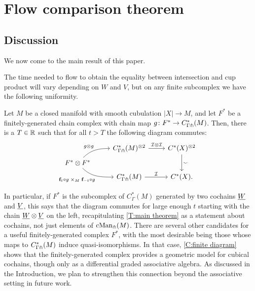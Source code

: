 
\section{Flow comparison theorem}\label{S:flow comparison theorem}

\subsection{Discussion}

We now come to the main result of this paper.

\maintheorem*

The time needed to flow to obtain the equality between intersection and cup product will vary depending on $W$ and $V$, but on any finite subcomplex we have the following uniformity.

\begin{corollary}\label{C:finite diagram}
	Let $M$ be a closed manifold with smooth cubulation $|X| \to M$, and let $F^*$ be a finitely-generated chain complex with chain map $g \colon F^*\to C^*_{\Gamma \pitchfork}(M)$.
	Then, there is a $T \in \mathbb{R}$ such that for all $t > T$ the following diagram commutes:
	\begin{equation*}
		\begin{tikzcd} [row sep=tiny]
			& C^*_{\Gamma \pf}(M)^{\otimes 2} \arrow[r, "\cI \otimes \cI"] & \cochains(X)^{\otimes 2} \arrow[dd, "\sms"] \\
			F^*\otimes F^* \arrow[ur, in=180, out=45,"g\otimes g"] \arrow[dr, in=180, out=-45, "\f_t \circ g \; \times_M \; \f_{-t} \circ g"']& & \\
			& C^*_{\Gamma \pf}(M) \arrow[r, "\cI"] & \cochains(X).
		\end{tikzcd}
	\end{equation*}
\end{corollary}

In particular, if $F^*$ is the subcomplex of $C^*_\Gamma(M)$ generated by two cochains $\underline{W}$ and $\underline{V}$, this says that the diagram commutes for large enough $t$ starting with the chain $\underline{W}\otimes\underline{V}$ on the left, recapitulating \cref{T:main theorem} as a statement about cochains, not just elements of $\mathrm{cMan}_\pitchfork(M)$.
There are several other candidates for a useful finitely-generated complex $F^*$, with the most desirable being those whose maps to $C^*_{\Gamma \pitchfork}(M)$ induce quasi-isomorphisms.
In that case, \cref{C:finite diagram} shows that the finitely-generated complex provides a geometric model for cubical cochains, though only as a differential graded associative algebra.
As discussed in the Introduction, we plan to strengthen this connection beyond the associative setting in future work.

